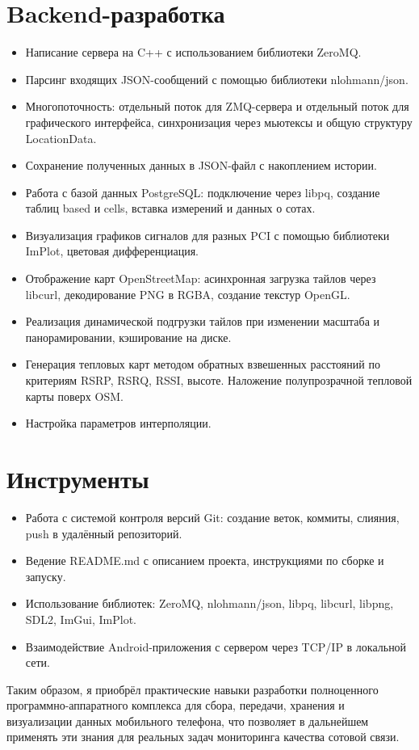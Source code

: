 \section*{Backend-разработка}
\begin{itemize}
    \item Написание сервера на C++ с использованием библиотеки ZeroMQ.
    \item Парсинг входящих JSON-сообщений с помощью библиотеки nlohmann/json.
    \item Многопоточность: отдельный поток для ZMQ-сервера и отдельный поток для графического интерфейса, синхронизация через мьютексы и общую структуру LocationData.
    \item Сохранение полученных данных в JSON-файл с накоплением истории.
    \item Работа с базой данных PostgreSQL: подключение через libpq, создание таблиц based и cells, вставка измерений и данных о сотах.
    \item Визуализация графиков сигналов для разных PCI с помощью библиотеки ImPlot, цветовая дифференциация.
    \item Отображение карт OpenStreetMap: асинхронная загрузка тайлов через libcurl, декодирование PNG в RGBA, создание текстур OpenGL.
    \item Реализация динамической подгрузки тайлов при изменении масштаба и панорамировании, кэширование на диске.
    \item Генерация тепловых карт методом обратных взвешенных расстояний по критериям RSRP, RSRQ, RSSI, высоте. Наложение полупрозрачной тепловой карты поверх OSM.
    \item Настройка параметров интерполяции.
\end{itemize}

\section*{Инструменты}
\begin{itemize}
    \item Работа с системой контроля версий Git: создание веток, коммиты, слияния, push в удалённый репозиторий.
    \item Ведение README.md с описанием проекта, инструкциями по сборке и запуску.
    \item Использование библиотек: ZeroMQ, nlohmann/json, libpq, libcurl, libpng, SDL2, ImGui, ImPlot.
    \item Взаимодействие Android-приложения с сервером через TCP/IP в локальной сети.
\end{itemize}

Таким образом, я приобрёл практические навыки разработки полноценного программно-аппаратного комплекса для сбора, передачи, хранения и визуализации данных мобильного телефона, что позволяет в дальнейшем применять эти знания для реальных задач мониторинга качества сотовой связи.
\endinput